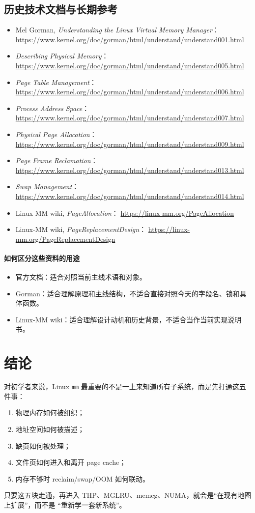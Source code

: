 \documentclass[UTF8,a4paper,11pt]{ctexart}
\begin{document}
\subsection*{历史技术文档与长期参考}
\begin{itemize}
  \item Mel Gorman, \textit{Understanding the Linux Virtual Memory Manager}：
  \url{https://www.kernel.org/doc/gorman/html/understand/understand001.html}
  \item \textit{Describing Physical Memory}：
  \url{https://www.kernel.org/doc/gorman/html/understand/understand005.html}
  \item \textit{Page Table Management}：
  \url{https://www.kernel.org/doc/gorman/html/understand/understand006.html}
  \item \textit{Process Address Space}：
  \url{https://www.kernel.org/doc/gorman/html/understand/understand007.html}
  \item \textit{Physical Page Allocation}：
  \url{https://www.kernel.org/doc/gorman/html/understand/understand009.html}
  \item \textit{Page Frame Reclamation}：
  \url{https://www.kernel.org/doc/gorman/html/understand/understand013.html}
  \item \textit{Swap Management}：
  \url{https://www.kernel.org/doc/gorman/html/understand/understand014.html}
  \item Linux-MM wiki, \textit{PageAllocation}：
  \url{https://linux-mm.org/PageAllocation}
  \item Linux-MM wiki, \textit{PageReplacementDesign}：
  \url{https://linux-mm.org/PageReplacementDesign}
\end{itemize}

\paragraph{如何区分这些资料的用途}
\begin{itemize}
  \item 官方文档：适合对照当前主线术语和对象。
  \item Gorman：适合理解原理和主线结构，不适合直接对照今天的字段名、锁和具体函数。
  \item Linux-MM wiki：适合理解设计动机和历史背景，不适合当作当前实现说明书。
\end{itemize}

\section{结论}

对初学者来说，Linux \texttt{mm} 最重要的不是一上来知道所有子系统，而是先打通这五件事：

\begin{enumerate}
  \item 物理内存如何被组织；
  \item 地址空间如何被描述；
  \item 缺页如何被处理；
  \item 文件页如何进入和离开 page cache；
  \item 内存不够时 reclaim/swap/OOM 如何联动。
\end{enumerate}

只要这五块走通，再进入 THP、MGLRU、memcg、NUMA，就会是“在现有地图上扩展”，而不是
“重新学一套新系统”。
\end{document}
